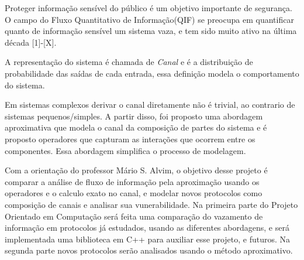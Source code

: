 Proteger informação sensível do público é um objetivo importante de segurança. O campo do Fluxo Quantitativo de Informação(QIF) se preocupa em quantificar quanto de informação sensível um sistema vaza, e tem sido muito ativo na última década [1]-[X]. 

A representação do sistema é chamada de \emph{Canal} e é a distribuição de probabilidade das saídas de cada entrada, essa definição modela o comportamento do sistema.

Em sistemas complexos derivar o canal diretamente não é trivial, ao contrario de sistemas pequenos/simples.
A partir disso, foi proposto uma abordagem aproximativa que modela o canal da composição de partes do sistema e é proposto operadores que capturam as interações que ocorrem entre os componentes. %
Essa abordagem simplifica o processo de modelagem. %

Com a orientação do professor Mário S. Alvim, o objetivo desse projeto é comparar a análise de fluxo de informação pela aproximação usando os operadores e o calculo exato no canal, e modelar novos protocolos como composição de canais e analisar sua vunerabilidade.
Na primeira parte do Projeto Orientado em Computação será feita uma comparação do vazamento de informação em protocolos já estudados, usando as diferentes abordagens, e será implementada uma biblioteca em C++ para auxiliar esse projeto, e futuros. 
Na segunda parte novos protocolos serão analisados usando o método aproximativo.
